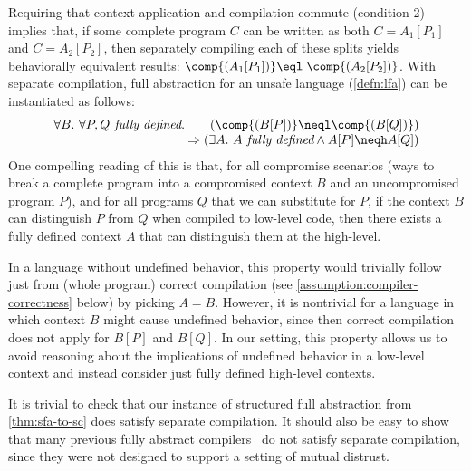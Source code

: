 \documentclass[10pt, conference, compsocconf, letterpaper, times]{IEEEtran}
\begin{document}
Requiring that context application and compilation commute (condition 2)
implies that, if some complete program $C$ can be written
as both $C = A_1[P_1]$ and $C = A_2[P_2]$, then separately compiling
each of these splits yields behaviorally equivalent results:
$\comp{(A_1[P_1])} \eql\; \comp{(A_2[P_2])}$.
With separate compilation, full abstraction for an unsafe language
(\autoref{defn:lfa}) can be instantiated as follows:
\[
\begin{array}{r}
\forall B.~\forall P,Q\textit{ fully defined}.\qquad
(\comp{(B[P])} \neql \comp{(B[Q])})\\
\Rightarrow (\exists A.~ A\textit{ fully defined} \wedge A[P] \neqh A[Q])
\end{array}
\]
One compelling reading of this is that, for all compromise scenarios
(ways to break a complete program into a compromised context $B$ and
an uncompromised program $P$),
and for all programs $Q$ that we can substitute for $P$, if the
context $B$ can distinguish $P$ from $Q$ when compiled to
low-level code, then there exists a fully defined context $A$
that can distinguish them at the high-level.


In a language without undefined behavior, this property would
trivially follow just from (whole program) correct compilation (see
\autoref{assumption:compiler-correctness} below) by picking $A = B$.
However, it is nontrivial for a language in which
context $B$ might cause undefined behavior, since then correct
compilation does not apply for $B[P]$ and $B[Q]$.
In our setting, this property allows us to avoid reasoning about the
implications of undefined behavior in a low-level
context and instead consider just fully defined high-level
contexts. 

It is trivial to check that our instance of structured full
abstraction from \autoref{thm:sfa-to-sc} does satisfy separate
compilation.
It should also be easy to show that many previous fully abstract
compilers~\cite{PatrignaniASJCP15, AgtenSJP12, LarmuseauPC15,
  PatrignaniCP13, patrignani_thesis} do not satisfy separate
compilation, since they were not designed to support a setting of
mutual distrust.

\ifsooner
{}
\fi

\ifsooner
{}
\end{document}
